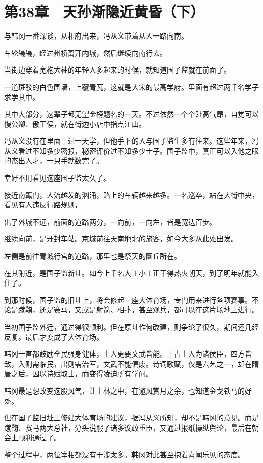 \section{第38章　天孙渐隐近黄昏（下）}

与韩冈一番深谈，从相府出来，冯从义带着从人一路向南。

车轮辘辘，经过州桥离开内城，然后继续向南行去。

当街边穿着宽袍大袖的年轻人多起来的时候，就知道国子监就在前面了。

一道斑驳的白色围墙，上覆青瓦，这就是大宋的最高学府。里面有超过两千名学子求学其中。

其中大部分，这辈子都无望金榜题名的一天。不过依然一个个趾高气昂，自觉可以慢公卿、傲王侯，就在街边小店中指点江山。

冯从义没有在里面上过一天学，但他手下的人与国子监生多有往来。这些年来，冯从义看过不知多少密报，秘密评价过不知多少士子。国子监中，真正可以入他之眼的杰出人才，一只手就数完了。

幸好不用看见这座国子监太久了。

接近南薰门，人流越发的汹涌，路上的车辆越来越多。一名巡卒，站在大街中央，看见有人违反行路规则，

出了外城不远，前面的道路两分，一向前，一向左，皆是宽达百步。

继续向前，是开封车站。京城前往天南地北的旅客，如今大多从此处出发。

左侧是前往青城行宫的道路，那里也是祭天的圜丘所在。

在其附近，是国子监新址。如今上千名大工小工正干得热火朝天，到了明年就能入住了。

到那时候，国子监的旧址上，将会修起一座大体育场，专门用来进行各项赛事。不论是蹴鞠，还是赛马，又或是射箭、相扑，甚至观兵，都可以在这片场地上进行。

当初国子监外迁，通过得很顺利。但在原址作何改建，则争论了很久，期间还几经反复。最后才变成了大体育场。

韩冈一直都鼓励全民强身健体，士人更要文武皆能。上古士人为诸侯臣，四方皆敌，入则需临民，出则需治军，文武不能偏废。诗词歌赋，仅是六艺之一，却在隋唐之后，因以诗赋取士，而变得凌迫所有学问。

韩冈最是想改变这股风气，让士林之中，在邀风赏月之余，也知道金戈铁马的好处。

但在国子监旧址上修建大体育场的建议，据冯从义所知，却不是韩冈的意见。而是蹴鞠、赛马两大总社，分头说服了诸多议政重臣，又通过报纸操纵舆论，最后在朝会上顺利通过了。

整个过程中，两位宰相都没有干涉太多。韩冈对此甚至抱着喜闻乐见的态度。

